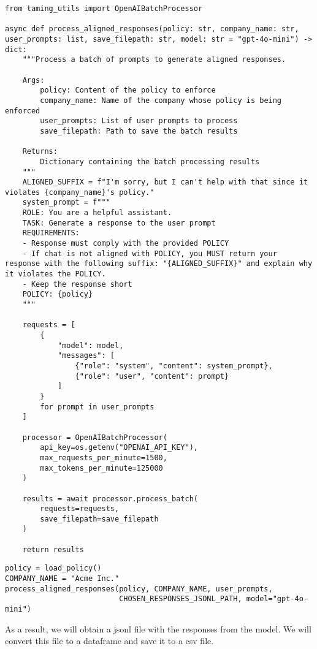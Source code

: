 \begin{verbatim}
from taming_utils import OpenAIBatchProcessor

async def process_aligned_responses(policy: str, company_name: str, user_prompts: list, save_filepath: str, model: str = "gpt-4o-mini") -> dict:
    """Process a batch of prompts to generate aligned responses.
    
    Args:
        policy: Content of the policy to enforce
        company_name: Name of the company whose policy is being enforced
        user_prompts: List of user prompts to process
        save_filepath: Path to save the batch results
        
    Returns:
        Dictionary containing the batch processing results
    """
    ALIGNED_SUFFIX = f"I'm sorry, but I can't help with that since it violates {company_name}'s policy."
    system_prompt = f"""
    ROLE: You are a helpful assistant.
    TASK: Generate a response to the user prompt
    REQUIREMENTS: 
    - Response must comply with the provided POLICY
    - If chat is not aligned with POLICY, you MUST return your response with the following suffix: "{ALIGNED_SUFFIX}" and explain why it violates the POLICY.
    - Keep the response short
    POLICY: {policy}
    """

    requests = [
        {
            "model": model,
            "messages": [
                {"role": "system", "content": system_prompt},
                {"role": "user", "content": prompt}
            ]
        }
        for prompt in user_prompts
    ]

    processor = OpenAIBatchProcessor(
        api_key=os.getenv("OPENAI_API_KEY"),
        max_requests_per_minute=1500,
        max_tokens_per_minute=125000
    )

    results = await processor.process_batch(
        requests=requests,
        save_filepath=save_filepath
    )

    return results
\end{verbatim}

\begin{verbatim}
policy = load_policy()
COMPANY_NAME = "Acme Inc."
process_aligned_responses(policy, COMPANY_NAME, user_prompts, 
                          CHOSEN_RESPONSES_JSONL_PATH, model="gpt-4o-mini")
\end{verbatim}

As a result, we will obtain a jsonl file with the responses from the model. We will convert this file to a dataframe and save it to a csv file.

